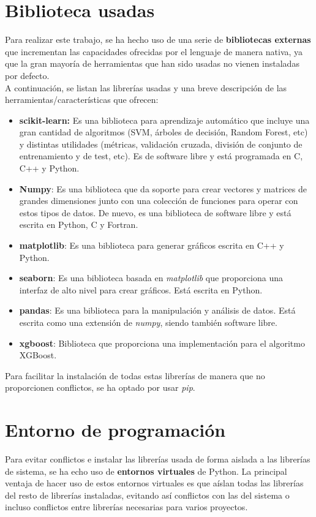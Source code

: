 \section{Biblioteca usadas}
Para realizar este trabajo, se ha hecho uso de una serie de \textbf{bibliotecas externas} que incrementan las capacidades ofrecidas por el lenguaje de manera nativa, ya que la gran mayoría de herramientas que han sido usadas no vienen instaladas por defecto.\\
A continuación, se listan las librerías usadas y una breve descripción de las herramientas/características que ofrecen:
\begin{itemize}
    \item \textbf{scikit-learn:} Es una biblioteca para aprendizaje automático que incluye una gran cantidad de algoritmos (SVM, árboles de decisión, Random Forest, etc) y distintas utilidades (métricas, validación cruzada, división de conjunto de entrenamiento y de test, etc). Es de software libre y está programada en C, C++ y Python.
    \item \textbf{Numpy}: Es una biblioteca que da soporte para crear vectores y matrices de grandes dimensiones junto con una colección de funciones para operar con estos tipos de datos. De nuevo, es una biblioteca de software libre y está escrita en Python, C y Fortran.
    \item \textbf{matplotlib}: Es una biblioteca para generar gráficos escrita en C++ y Python.
    \item \textbf{seaborn}: Es una biblioteca basada en \textit{matplotlib} que proporciona una interfaz de alto nivel para crear gráficos. Está escrita en Python.
    \item \textbf{pandas}: Es una biblioteca para la manipulación y análisis de datos.  Está escrita como una extensión de \textit{numpy}, siendo también software libre.
    \item \textbf{xgboost}: Biblioteca que proporciona una implementación para el algoritmo XGBoost.
\end{itemize}
Para facilitar la instalación de todas estas librerías de manera que no proporcionen conflictos, se ha optado por usar \textit{pip}.
\section{Entorno de programación}
Para evitar conflictos e instalar las librerías usada de forma aislada a las librerías de sistema, se ha echo uso de \textbf{entornos virtuales} de Python. La principal ventaja de hacer uso de estos entornos virtuales es que aíslan todas las librerías del resto de librerías instaladas, evitando así conflictos con las del sistema o incluso conflictos entre librerías necesarias para varios proyectos.
